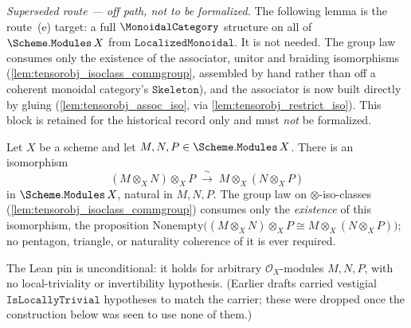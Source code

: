 \emph{Superseded route --- off path, not to be formalized.} The following lemma is
the route~(e) target: a full \(\MonoidalCategory\) structure on all of
\(\Scheme.\mathtt{Modules}\,X\) from \(\mathtt{LocalizedMonoidal}\). It is not
needed. The group law consumes only the existence of the associator, unitor and
braiding isomorphisms (\cref{lem:tensorobj_isoclass_commgroup}, assembled by hand
rather than off a coherent monoidal category's \(\mathtt{Skeleton}\)), and the
associator is now built directly by
gluing (\cref{lem:tensorobj_assoc_iso}, via \cref{lem:tensorobj_restrict_iso}). This
block is retained for the historical record only and must \emph{not} be formalized.

\begin{lemma}


  \label{lem:tensorobj_assoc_iso}
  Let \(X\) be a scheme and let
  \(M, N, P \in \Scheme.\mathtt{Modules}\,X\). There is an isomorphism
  \[
    (M \otimes_X N) \otimes_X P
      \;\xrightarrow{\ \sim\ }\;
    M \otimes_X (N \otimes_X P)
  \]
  in \(\Scheme.\mathtt{Modules}\,X\), natural in \(M, N, P\). The group law on
  \(\otimes\)-iso-classes (\cref{lem:tensorobj_isoclass_commgroup}) consumes only
  the \emph{existence} of this isomorphism, the proposition
  \(\mathrm{Nonempty}\bigl((M \otimes_X N) \otimes_X P \cong M \otimes_X (N
  \otimes_X P)\bigr)\); no pentagon, triangle, or naturality coherence of it is
  ever required.

  The Lean pin is unconditional: it holds for arbitrary
  \(\mathcal{O}_X\)-modules \(M, N, P\), with no local-triviality or
  invertibility hypothesis. (Earlier drafts carried vestigial
  \(\mathtt{IsLocallyTrivial}\) hypotheses to match the carrier; these were
  dropped once the construction below was seen to use none of them.)
\end{lemma}

